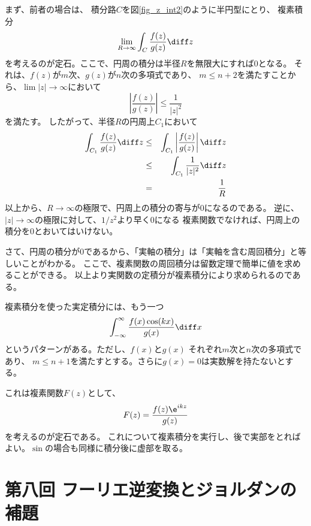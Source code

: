 まず、前者の場合は、
積分路$C$を図\ref{fig_z_int2}のように半円型にとり、
複素積分
\begin{equation}
  \lim_{R \rightarrow \infty}\int_C \frac{f(z)}{g(z)} \diff z
\end{equation}
を考えるのが定石。ここで、円周の積分は半径$R$を無限大にすれば$0$となる。
それは、$f(z)$が$m$次、$g(z)$が$n$次の多項式であり、
$m\le n + 2$を満たすことから、$\lim |z| \rightarrow \infty$において
\begin{equation}
  \left| \frac{f(z)}{g(z)} \right| \leq \frac{1}{|z|^2}
\end{equation}
を満たす。
したがって、半径$R$の円周上$C_1$において
\begin{eqnarray}
  \int_{C_1} \frac{f(z)}{g(z)} \diff z &\leq& \int_{C_1} \left| \frac{f(z)}{g(z)} \right| \diff z \\
  &\leq& \int_{C_1}  \frac{1}{|z|^2} \diff z\\
  &= & \frac{1}{R}
\end{eqnarray}
以上から、$R \rightarrow \infty$の極限で、円周上の積分の寄与が$0$になるのである。
逆に、$|z| \rightarrow \infty$の極限に対して、$1/z^2$より早く$0$になる
複素関数でなければ、円周上の積分を$0$とおいてはいけない。

さて、円周の積分が$0$であるから、「実軸の積分」は「実軸を含む周回積分」と等しいことがわかる。
ここで、複素関数の周回積分は留数定理で簡単に値を求めることができる。
以上より実関数の定積分が複素積分により求められるのである。

複素積分を使った実定積分には、もう一つ
\begin{equation}
  \int_{-\infty}^{\infty} \frac{f(x)\cos(kx)}{g(x)} \diff x
\end{equation}
というパターンがある。ただし、$f(x)$と$g(x)$
それぞれ$m$次と$n$次の多項式であり、
$m\le n + 1$を満たすとする。さらに$g(x)=0$は実数解を持たないとする。

これは複素関数$F(z)$として、
\begin{equation}
  F(z) =  \frac{f(z) \e^{ikz}}{g(z)}
\end{equation}
を考えるのが定石である。
これについて複素積分を実行し、後で実部をとればよい。$\sin$の場合も同様に積分後に虚部を取る。

\newpage
\section{第八回 フーリエ逆変換とジョルダンの補題}


